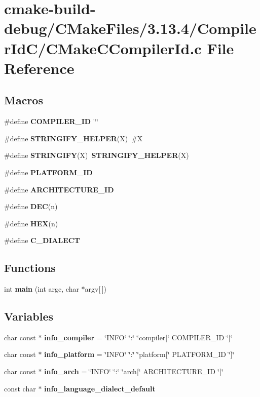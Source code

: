 \section{cmake-\/build-\/debug/\+C\+Make\+Files/3.13.4/\+Compiler\+Id\+C/\+C\+Make\+C\+Compiler\+Id.c File Reference}
\label{3_813_84_2_compiler_id_c_2_c_make_c_compiler_id_8c}
\subsection*{Macros}
\begin{DoxyCompactItemize}
\item 
\#define {\bf C\+O\+M\+P\+I\+L\+E\+R\+\_\+\+ID}~\char`\"{}\char`\"{}
\item 
\#define {\bf S\+T\+R\+I\+N\+G\+I\+F\+Y\+\_\+\+H\+E\+L\+P\+ER}(X)~\#X
\item 
\#define {\bf S\+T\+R\+I\+N\+G\+I\+FY}(X)~{\bf S\+T\+R\+I\+N\+G\+I\+F\+Y\+\_\+\+H\+E\+L\+P\+ER}(X)
\item 
\#define {\bf P\+L\+A\+T\+F\+O\+R\+M\+\_\+\+ID}
\item 
\#define {\bf A\+R\+C\+H\+I\+T\+E\+C\+T\+U\+R\+E\+\_\+\+ID}
\item 
\#define {\bf D\+EC}(n)
\item 
\#define {\bf H\+EX}(n)
\item 
\#define {\bf C\+\_\+\+D\+I\+A\+L\+E\+CT}
\end{DoxyCompactItemize}
\subsection*{Functions}
\begin{DoxyCompactItemize}
\item 
int {\bf main} (int argc, char $\ast$argv[$\,$])
\end{DoxyCompactItemize}
\subsection*{Variables}
\begin{DoxyCompactItemize}
\item 
char const $\ast$ {\bf info\+\_\+compiler} = \char`\"{}I\+N\+FO\char`\"{} \char`\"{}\+:\char`\"{} \char`\"{}compiler[\char`\"{} C\+O\+M\+P\+I\+L\+E\+R\+\_\+\+ID \char`\"{}]\char`\"{}
\item 
char const $\ast$ {\bf info\+\_\+platform} = \char`\"{}I\+N\+FO\char`\"{} \char`\"{}\+:\char`\"{} \char`\"{}platform[\char`\"{} P\+L\+A\+T\+F\+O\+R\+M\+\_\+\+ID \char`\"{}]\char`\"{}
\item 
char const $\ast$ {\bf info\+\_\+arch} = \char`\"{}I\+N\+FO\char`\"{} \char`\"{}\+:\char`\"{} \char`\"{}arch[\char`\"{} A\+R\+C\+H\+I\+T\+E\+C\+T\+U\+R\+E\+\_\+\+ID \char`\"{}]\char`\"{}
\item 
const char $\ast$ {\bf info\+\_\+language\+\_\+dialect\+\_\+default}
\end{DoxyCompactItemize}


